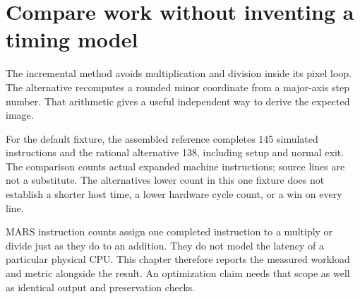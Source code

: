 \section{Compare work without inventing a timing
  model}\label{007-bresenham-line-p11-compare-work-without-inventing-a-timing-model}

The incremental method avoids multiplication and division inside its
pixel loop. The alternative recomputes a rounded minor coordinate from a
major-axis step number. That arithmetic gives a useful independent way
to derive the expected image.

For the default fixture, the assembled reference completes 145 simulated
instructions and the rational alternative 138, including setup and
normal exit. The comparison counts actual expanded machine instructions;
source lines are not a substitute. The alternative\textquotesingle s
lower count in this one fixture does not establish a shorter host time,
a lower hardware cycle count, or a win on every line.

MARS instruction counts assign one completed instruction to a multiply
or divide just as they do to an addition. They do not model the latency
of a particular physical CPU. This chapter therefore reports the
measured workload and metric alongside the result. An optimization claim
needs that scope as well as identical output and preservation checks.
